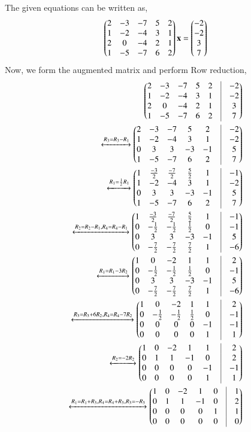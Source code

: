    The given equations can be written as,
   \begin{align}
  \begin{pmatrix}2&-3&-7&5&2\\1&-2&-4&3&1\\2&0&-4&2&1\\1&-5&-7&6&2\end{pmatrix}\mathbf{x}=\begin{pmatrix}-2\\-2\\3\\7\end{pmatrix}
   \end{align}
   Now, we form the augmented matrix and perform Row reduction,
   \begin{align}
      \myvec{2&-3&-7&5&2&\vrule&-2\\1&-2&-4&3&1&\vrule&-2\\2&0&-4&2&1&\vrule&3\\1&-5&-7&6&2&\vrule&7}\\
        \xleftrightarrow{R_3=R_3-R_1}\myvec{2&-3&-7&5&2&\vrule&-2\\1&-2&-4&3&1&\vrule&-2\\0&3&3&-3&-1&\vrule&5\\1&-5&-7&6&2&\vrule&7}\\
     \xleftrightarrow{R_1=\frac{1}{2}R_1}\myvec{1&\frac{-3}{2}&\frac{-7}{2}&\frac{5}{2}&1&\vrule&-1\\1&-2&-4&3&1&\vrule&-2\\0&3&3&-3&-1&\vrule&5\\1&-5&-7&6&2&\vrule&7}\\
      \xleftrightarrow{R_2=R_2-R_1,R_4=R_4-R_1}\myvec{1&\frac{-3}{2}&\frac{-7}{2}&\frac{5}{2}&1&\vrule&-1\\0&-\frac{1}{2}&-\frac{1}{2}&\frac{1}{2}&0&\vrule&-1\\0&3&3&-3&-1&\vrule&5\\0&-\frac{7}{2}&-\frac{7}{2}&\frac{7}{2}&1&\vrule&-6}\\
      \xleftrightarrow{R_1=R_1-3R_2}\myvec{1&0&-2&1&1&\vrule&2\\0&-\frac{1}{2}&-\frac{1}{2}&\frac{1}{2}&0&\vrule&-1\\0&3&3&-3&-1&\vrule&5\\0&-\frac{7}{2}&-\frac{7}{2}&\frac{7}{2}&1&\vrule&-6}\\
      \xleftrightarrow{R_3=R_3+6R_2, R_4=R_4-7R_2}\myvec{1&0&-2&1&1&\vrule&2\\0&-\frac{1}{2}&-\frac{1}{2}&\frac{1}{2}&0&\vrule&-1\\0&0&0&0&-1&\vrule&-1\\0&0&0&0&1&\vrule&1}\\
      \xleftrightarrow{R_2=-2R_2}\myvec{1&0&-2&1&1&\vrule&2\\0&1&1&-1&0&\vrule&2\\0&0&0&0&-1&\vrule&-1\\0&0&0&0&1&\vrule&1}\\
      \xleftrightarrow{R_1=R_1+R_3,R_4=R_4+R_3,R_3=-R_3}\myvec{1&0&-2&1&0&\vrule&1\\0&1&1&-1&0&\vrule&2\\0&0&0&0&1&\vrule&1\\0&0&0&0&0&\vrule&0}
\end{align}

